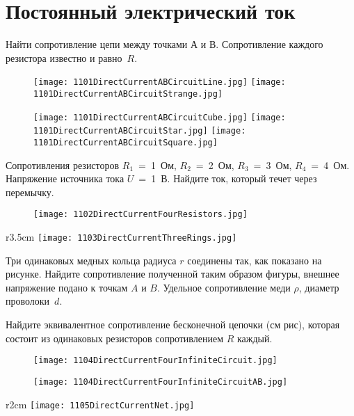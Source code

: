 \section{Постоянный электрический ток}

\AddProb Найти сопротивление цепи между точками $А$ и $В$. Сопротивление каждого резистора известно и равно~$R$.

\begin{figure}[!h]
\texttt{[image: 1101DirectCurrentABCircuitLine.jpg]}
\texttt{[image: 1101DirectCurrentABCircuitStrange.jpg]}
\end{figure}

\begin{figure}[!h]
\texttt{[image: 1101DirectCurrentABCircuitCube.jpg]}
\texttt{[image: 1101DirectCurrentABCircuitStar.jpg]}
\texttt{[image: 1101DirectCurrentABCircuitSquare.jpg]}
\end{figure}

\AddProb Сопротивления резисторов $R_1$~=~1~Ом, $R_2$~=~2~Ом, $R_3$~=~3~Ом, $R_4$~=~4~Ом. 
Напряжение источника тока $U$~=~1~В. Найдите ток, который течет через перемычку.

\begin{figure}[!h]
\texttt{[image: 1102DirectCurrentFourResistors.jpg]}
\end{figure}

\begin{wrapfigure}{r}{3.5cm}
\texttt{[image: 1103DirectCurrentThreeRings.jpg]}
\end{wrapfigure}

\AddProb Три одинаковых медных кольца радиуса $r$ соединены так, как показано на рисунке. 
Найдите сопротивление полученной таким образом фигуры, внешнее напряжение подано к точкам $A$ и $B$. 
Удельное сопротивление меди $\rho$, диаметр проволоки~$d$.

\AddProb Найдите эквивалентное сопротивление бесконечной цепочки (см рис), которая состоит из одинаковых резисторов сопротивлением $R$ каждый.

\begin{figure}[!h]
\texttt{[image: 1104DirectCurrentFourInfiniteCircuit.jpg]}

\texttt{[image: 1104DirectCurrentFourInfiniteCircuitAB.jpg]}
\end{figure}

\begin{wrapfigure}{r}{2cm}
\texttt{[image: 1105DirectCurrentNet.jpg]}
\end{wrapfigure}

